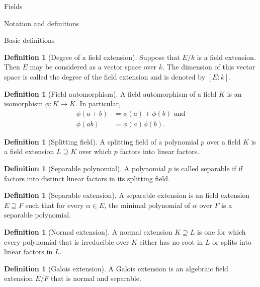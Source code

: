 \documentclass{article}
\theoremstyle{definition}
\numberwithin{theorem}{subsection} %
\theoremstyle{remark}
\theoremstyle{definition}
\newtheorem{definition}[paragraph]{Definition}
\newcommand{\fn}[3]{{#1 \colon #2 \rightarrow #3}}
\begin{document}
\begin{section}{Fields}
  \begin{subsection}{Notation and definitions}
    \begin{subsubsection}{Basic definitions}
      \begin{definition}[Degree of a field extension]
        Suppose that $E/k$ is a field extension. Then $E$ may be considered as a
        vector space over $k$. The dimension of this vector space is called
        the degree of the field extension and is denoted by $[E:k]$.
      \end{definition}
      \begin{definition}[Field automorphism]
        A field automorphism of a field $K$ is an isomorphism $\fn \phi K K$.
        In particular, \begin{align*}
          \phi(a + b) &= \phi(a) + \phi(b) \text{ and}\\
          \phi(ab) &= \phi(a)\phi(b).
        \end{align*}
      \end{definition}
      \begin{definition}[Splitting field]
        A splitting field of a polynomial $p$ over a field $K$ is a field
        extension $L \supseteq K$ over which $p$ factors into linear factors.
      \end{definition}
      \begin{definition}[Separable polynomial]
        A polynomial $p$ is called separable if if factors into distinct linear
        factors in its splitting field.
      \end{definition}
      \begin{definition}[Separable extension]
        A separable extension is an field extension $E \supseteq F$ such that
        for every $\alpha \in E$, the minimal polynomial of $\alpha$ over $F$ is
        a separable polynomial.
      \end{definition}
      \begin{definition}[Normal extension]
        A normal extension $K \supseteq L$ is one for which every polynomial that
        is irreducible over $K$ either has no root in $L$ or splits into linear
        factors in $L$.
      \end{definition}
      \begin{definition}[Galois extension]
        A Galois extension is an algebraic field extension $E/F$ that is normal
        and separable.
      \end{definition}

\end{subsubsection}
\end{subsection}
\end{section}
\end{document}
